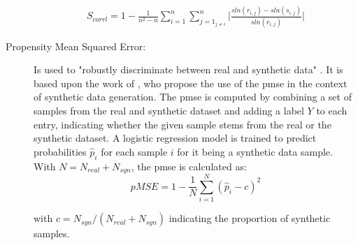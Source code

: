 \begin{description}
  \begin{equation}
    \begin{align}
      \label{eqn:s_corrl}
      S_{corrl} = 1-\frac{1}{n^2-n} \sum_{i=1}^{n}\sum_{j=1_{j \neq i}}^{n} \bigg| \frac{sln(r_{i,j})- sln(s_{i,j})}{sln(r_{i,j})}\bigg| 
      \end{align}
  \end{equation}

  \item[Propensity Mean Squared Error:]
  Is used to "robustly discriminate between real and synthetic data" \cite[p. 3]{chundawat2022UniversalMetricRobust}.
  It is based upon the work of \textcite{snoke2018GeneralSpecificUtility}, who propose the use of the \gls{pmse} in the context of synthetic data generation.
  The \gls{pmse} is computed by combining a set of samples from the real and synthetic dataset and adding a label $Y$ to each entry, 
  indicating whether the given sample stems from the real or the synthetic dataset.
  A logistic regression model is trained to predict probabilities $\hat{p}_i$ for each sample $i$ for it being a synthetic data sample.
  With $N=N_{real}+N_{syn}$, the \gls{pmse} is calculated as:
  $$pMSE = 1-\frac{1}{N} \sum_{i=1}^{N}(\hat{p}_i-c)^2$$

  with $c=N_{syn}/(N_{real}+N_{syn})$ indicating the proportion of synthetic samples.
  

\end{description}

